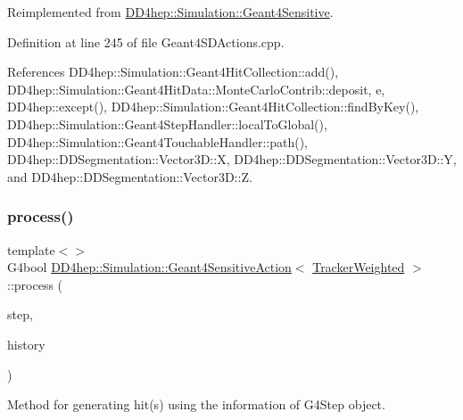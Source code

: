 Reimplemented from \hyperlink{class_d_d4hep_1_1_simulation_1_1_geant4_sensitive_a9a9463a6c29a66dad43a52ffc9f7838d}{D\+D4hep\+::\+Simulation\+::\+Geant4\+Sensitive}.



Definition at line 245 of file Geant4\+S\+D\+Actions.\+cpp.



References D\+D4hep\+::\+Simulation\+::\+Geant4\+Hit\+Collection\+::add(), D\+D4hep\+::\+Simulation\+::\+Geant4\+Hit\+Data\+::\+Monte\+Carlo\+Contrib\+::deposit, e, D\+D4hep\+::except(), D\+D4hep\+::\+Simulation\+::\+Geant4\+Hit\+Collection\+::find\+By\+Key(), D\+D4hep\+::\+Simulation\+::\+Geant4\+Step\+Handler\+::local\+To\+Global(), D\+D4hep\+::\+Simulation\+::\+Geant4\+Touchable\+Handler\+::path(), D\+D4hep\+::\+D\+D\+Segmentation\+::\+Vector3\+D\+::X, D\+D4hep\+::\+D\+D\+Segmentation\+::\+Vector3\+D\+::Y, and D\+D4hep\+::\+D\+D\+Segmentation\+::\+Vector3\+D\+::Z.

\hypertarget{class_d_d4hep_1_1_simulation_1_1_geant4_sensitive_action_ad11ea4c3e4623fb5e2a8851d1aebb5c7}{}\label{class_d_d4hep_1_1_simulation_1_1_geant4_sensitive_action_ad11ea4c3e4623fb5e2a8851d1aebb5c7} 
\subsubsection{\texorpdfstring{process()}{process()}\hspace{0.1cm}{\footnotesize\ttfamily [5/7]}}
{\footnotesize\ttfamily template$<$$>$ \\
G4bool \hyperlink{class_d_d4hep_1_1_simulation_1_1_geant4_sensitive_action}{D\+D4hep\+::\+Simulation\+::\+Geant4\+Sensitive\+Action}$<$ \hyperlink{struct_d_d4hep_1_1_simulation_1_1_tracker_weighted}{Tracker\+Weighted} $>$\+::process (\begin{DoxyParamCaption}\item[{G4\+Step $\ast$}]{step,  }\item[{G4\+Touchable\+History $\ast$}]{history }\end{DoxyParamCaption})\hspace{0.3cm}{\ttfamily [virtual]}}



Method for generating hit(s) using the information of G4\+Step object. 



